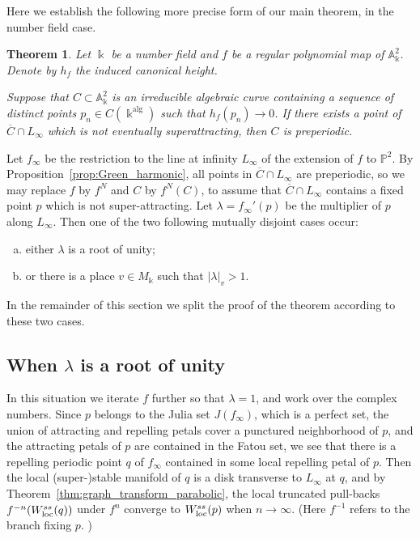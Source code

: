\documentclass[11 pt, oneside, a4paper]{amsart}
\newcommand{\A}{\mathbb{A}}
\renewcommand{\P}{\mathbb{P}}
\newcommand{\nA}{\mathbb{A}}
\newcommand{\loc}{\mathrm{loc}}
\newcommand{\abs}[1]{{\left|{#1}\right|}}
\newcommand{\nk}{\Bbbk}
\DeclareMathOperator{\alg}{alg}
\newcommand{\inv}{^{-1}}
\newtheorem{thm}{Theorem}[section]
\theoremstyle{definition}
\theoremstyle{definition}
\begin{document}
Here we establish the following more precise form of our main theorem, in the number field case.

\begin{thm}\label{thm:main_precised}
Let $\nk$ be a number field and  $f$ be  a regular polynomial map 
of $\A^2_\nk$. Denote by  $h_f$  the induced    canonical height.

Suppose that $C \subset \nA_\nk^2$ is an irreducible algebraic curve
containing a sequence of distinct points $p_n \in C(\nk^{\alg})$
such that 
$h_f(p_n) \to 0$. If there exists a point of $\overline C\cap L_\infty$ which is not 
eventually superattracting, then $C$ is preperiodic. 
\end{thm}

Let $f_\infty$ be the restriction  to the line at infinity $L_\infty$ of the extension of $f$ to $\P^2$. 
By Proposition~\ref{prop:Green_harmonic}, all points in  $\overline C\cap L_\infty$ are preperiodic, 
so   we may replace $f$ by $f^N$ and $C$ by 
$f^N(C)$, to assume that  $\overline C\cap L_\infty$ contains a fixed point $p$
which is not super-attracting. 
 Let  $\lambda = f_\infty'(p)$ be the multiplier of $p$ along $L_\infty$. 
 Then one of the two following mutually disjoint cases occur:
 \begin{enumerate}[(a)]
 \item either $\lambda$ is a root of unity;
 \item or there is a place $v\in M_\nk$ such that $\abs{\lambda}_v >1$. 
 \end{enumerate}
In the remainder of this section we  split the proof of the theorem according to these two cases.  


\subsection{When $\lambda$ is a root of unity} 

In this situation we iterate $f$ further so that $\lambda=1$, and work over the complex numbers. Since $p$ belongs to the Julia set $J(f_\infty)$, which is a perfect set, the union of attracting and repelling petals cover a punctured neighborhood of $p$, 
and the attracting petals of $p$ are contained in the Fatou set, 
we see that there is a repelling periodic point $q$
of $f_\infty$ contained in some local repelling petal of $p$. 
Then the local (super-)stable manifold of $q$ is a
disk transverse to $L_\infty$ at $q$, and by Theorem~\ref{thm:graph_transform_parabolic}, the local 
truncated pull-backs    $f^{-n}(W^{\rm ss}_\loc(q))$ 
under $f^n$ converge to $W^{\rm ss}_{\loc}(p)$ when $n\to \infty$. (Here $f\inv$ refers to the branch fixing $p$. )
\end{document}
